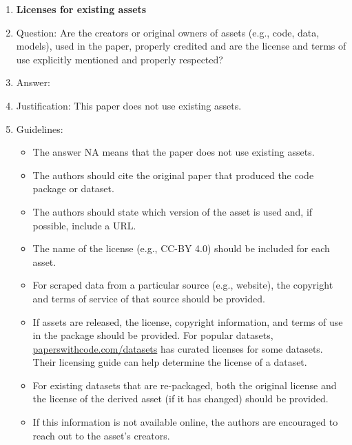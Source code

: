 \documentclass{article}
\begin{document}
\begin{enumerate}
\item {\bf Licenses for existing assets}
    \item[] Question: Are the creators or original owners of assets (e.g., code, data, models), used in the paper, properly credited and are the license and terms of use explicitly mentioned and properly respected?
    \item[] Answer:  \answerNA{} %
    \item[] Justification: This paper does not use existing assets.
    \item[] Guidelines:
    \begin{itemize}
        \item The answer NA means that the paper does not use existing assets.
        \item The authors should cite the original paper that produced the code package or dataset.
        \item The authors should state which version of the asset is used and, if possible, include a URL.
        \item The name of the license (e.g., CC-BY 4.0) should be included for each asset.
        \item For scraped data from a particular source (e.g., website), the copyright and terms of service of that source should be provided.
        \item If assets are released, the license, copyright information, and terms of use in the package should be provided. For popular datasets, \url{paperswithcode.com/datasets} has curated licenses for some datasets. Their licensing guide can help determine the license of a dataset.
        \item For existing datasets that are re-packaged, both the original license and the license of the derived asset (if it has changed) should be provided.
        \item If this information is not available online, the authors are encouraged to reach out to the asset's creators.
    \end{itemize}


\end{enumerate}
\end{document}
